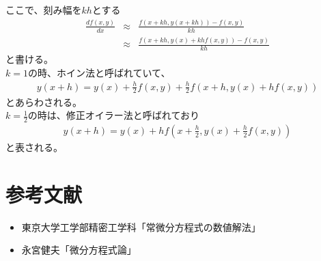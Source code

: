 \documentclass[pdflatex,ja=standard,fleqn]{bxjsarticle}
\begin{document}
ここで、刻み幅を$kh$とする
\begin{eqnarray*}
    \frac{df(x,y)}{dx}&\approx& \frac{f(x+kh,y(x+kh))-f(x,y)}{kh}\\
    &\approx& \frac{f(x+kh,y(x)+khf(x,y))-f(x,y)}{kh}
\end{eqnarray*}
と書ける。\\
$k=1$の時、ホイン法と呼ばれていて、
\begin{eqnarray*}
    y(x+h)=y(x)+\frac{h}{2}f(x,y)+\frac{h}{2}f(x+h,y(x)+hf(x,y))
\end{eqnarray*}
とあらわされる。\\
$k=\frac{1}{2}$の時は、修正オイラー法と呼ばれており
\begin{eqnarray*}
    y(x+h)=y(x)+hf(x+\frac{h}{2},y(x)+\frac{h}{2}f(x,y))
\end{eqnarray*}
と表される。
\section*{参考文献}
\begin{itemize}
    \item 東京大学工学部精密工学科「常微分方程式の数値解法」
    \item 永宮健夫「微分方程式論」
\end{itemize}
\end{document}

